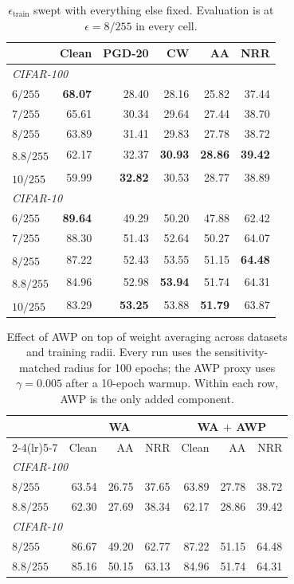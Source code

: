 \documentclass{article} %
\theoremstyle{plain}
\newcommand{\dg}{\textsuperscript{\dag}}
\begin{document}
\begin{table}[!htbp]
  \centering \small \setlength{\tabcolsep}{4.5pt}
  \caption{$\epsilon_{\mathrm{train}}$ swept with everything else fixed. Evaluation is at
  $\epsilon=8/255$ in every cell.}
  \label{tab:radius}
  \begin{tabular}{lrrrrr}
    \toprule
    & Clean & PGD-20 & CW & AA & NRR \\
    \midrule
    \multicolumn{6}{l}{\emph{CIFAR-100}} \\
    $6/255$      & \textbf{68.07} & 28.40 & 28.16 & 25.82 & 37.44 \\
    $7/255$      & 65.61 & 30.34 & 29.64 & 27.44 & 38.70 \\
    $8/255$      & 63.89 & 31.41 & 29.83 & 27.78 & 38.72 \\
    $8.8/255$\dg & 62.17 & 32.37 & \textbf{30.93} & \textbf{28.86} & \textbf{39.42} \\
    $10/255$\dg  & 59.99 & \textbf{32.82} & 30.53 & 28.77 & 38.89 \\
    \midrule
    \multicolumn{6}{l}{\emph{CIFAR-10}} \\
    $6/255$      & \textbf{89.64} & 49.29 & 50.20 & 47.88 & 62.42 \\
    $7/255$      & 88.30 & 51.43 & 52.64 & 50.27 & 64.07 \\
    $8/255$\dg   & 87.22 & 52.43 & 53.55 & 51.15 & \textbf{64.48} \\
    $8.8/255$\dg & 84.96 & 52.98 & \textbf{53.94} & 51.74 & 64.31 \\
    $10/255$\dg  & 83.29 & \textbf{53.25} & 53.88 & \textbf{51.79} & 63.87 \\
    \bottomrule
  \end{tabular}
\end{table}

\begin{table}[!htbp]
  \centering \small \setlength{\tabcolsep}{3.4pt}
  \caption{Effect of AWP on top of weight averaging across datasets and training radii. Every run uses
  the sensitivity-matched radius for 100 epochs; the AWP proxy uses $\gamma=0.005$ after a 10-epoch
  warmup. Within each row, AWP is the only added component.}
  \label{tab:stackboth}
  \begin{tabular}{lrrrrrr}
    \toprule
    & \multicolumn{3}{c}{WA} & \multicolumn{3}{c}{WA $+$ AWP} \\
    \cmidrule(lr){2-4}\cmidrule(lr){5-7}
    & Clean & AA & NRR & Clean & AA & NRR \\
    \midrule
    \multicolumn{7}{l}{\emph{CIFAR-100}} \\
    $8/255$   & 63.54 & 26.75 & 37.65 & 63.89 & 27.78 & 38.72 \\
    $8.8/255$ & 62.30 & 27.69 & 38.34 & 62.17 & 28.86 & 39.42 \\
    \midrule
    \multicolumn{7}{l}{\emph{CIFAR-10}} \\
    $8/255$   & 86.67 & 49.20 & 62.77 & 87.22 & 51.15 & 64.48 \\
    $8.8/255$ & 85.16 & 50.15 & 63.13 & 84.96 & 51.74 & 64.31 \\
    \bottomrule
  \end{tabular}
\end{table}
\end{document}
